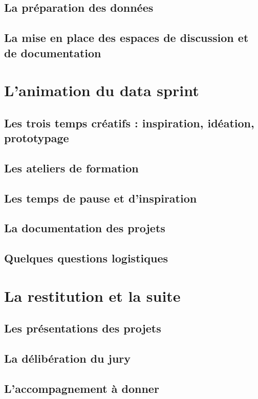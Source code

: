 \documentclass[]{book}
\begin{document}
\section{La préparation des données}\label{la-preparation-des-donnees}

\section{La mise en place des espaces de discussion et de
documentation}\label{la-mise-en-place-des-espaces-de-discussion-et-de-documentation}

\chapter{L'animation du data sprint}\label{animation}

\section{Les trois temps créatifs : inspiration, idéation,
prototypage}\label{les-trois-temps-creatifs-inspiration-ideation-prototypage}

\section{Les ateliers de formation}\label{les-ateliers-de-formation}

\section{Les temps de pause et
d'inspiration}\label{les-temps-de-pause-et-dinspiration}

\section{La documentation des
projets}\label{la-documentation-des-projets}

\section{Quelques questions
logistiques}\label{quelques-questions-logistiques}

\chapter{La restitution et la suite}\label{la-restitution-et-la-suite}

\section{Les présentations des
projets}\label{les-presentations-des-projets}

\section{La délibération du jury}\label{la-deliberation-du-jury}

\section{L'accompagnement à donner}\label{laccompagnement-a-donner}


\end{document}
